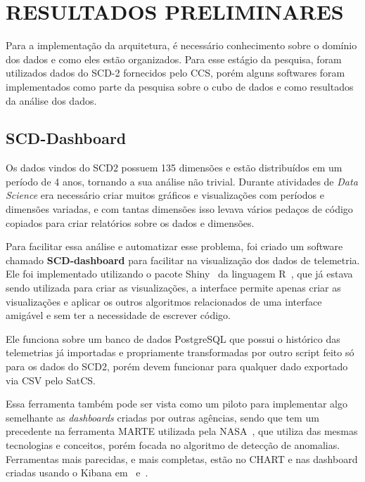 
\chapter{RESULTADOS PRELIMINARES}
\label{ch:impl}

{\color{red}
Para a implementação da arquitetura, é necessário conhecimento sobre o domínio dos dados e como eles estão organizados.
}
Para esse estágio da pesquisa, foram utilizados dados do SCD-2 fornecidos pelo CCS, porém alguns softwares foram implementados como parte da pesquisa sobre o cubo de dados e como resultados da análise dos dados.

\section{SCD-Dashboard}
\label{ch:impl:dash}

Os dados vindos do SCD2 possuem 135 dimensões e estão distribuídos em um período de 4 anos, tornando a sua análise não trivial.
Durante atividades de \textit{Data Science} era necessário criar muitos gráficos e visualizações com períodos e dimensões variadas, e com tantas dimensões isso levava vários pedaços de código copiados para criar relatórios sobre os dados e dimensões.

Para facilitar essa análise e automatizar esse problema, foi criado um software chamado \textbf{SCD-dashboard} para facilitar na visualização dos dados de telemetria.
Ele foi implementado utilizando o pacote Shiny~\cite{changShinyWebApplication2019} da linguagem R~\cite{rcoreteamLanguageEnvironmentStatistical2018}, que já estava sendo utilizada para criar as visualizações, a interface permite apenas criar as visualizações e aplicar os outros algoritmos relacionados de uma interface amigável e sem ter a necessidade de escrever código.

Ele funciona sobre um banco de dados PostgreSQL que possui o histórico das telemetrias já importadas e propriamente transformadas por outro script feito só para os dados do SCD2, porém devem funcionar para qualquer dado exportado via CSV pelo SatCS.

Essa ferramenta também pode ser vista como um piloto para implementar algo semelhante as \textit{dashboards} criadas por outras agências, sendo que tem um precedente na ferramenta MARTE utilizada pela NASA~\cite{fernandezTelemetryAnomalyDetection2017}, que utiliza das mesmas tecnologias e conceitos, porém focada no algoritmo de detecção de anomalias.
Ferramentas mais parecidas, e mais completas, estão no CHART e nas dashboard criadas usando o Kibana em~\cite{mateikUsingBigData2017} e~\cite{zhangBigDataFramework2017}.

